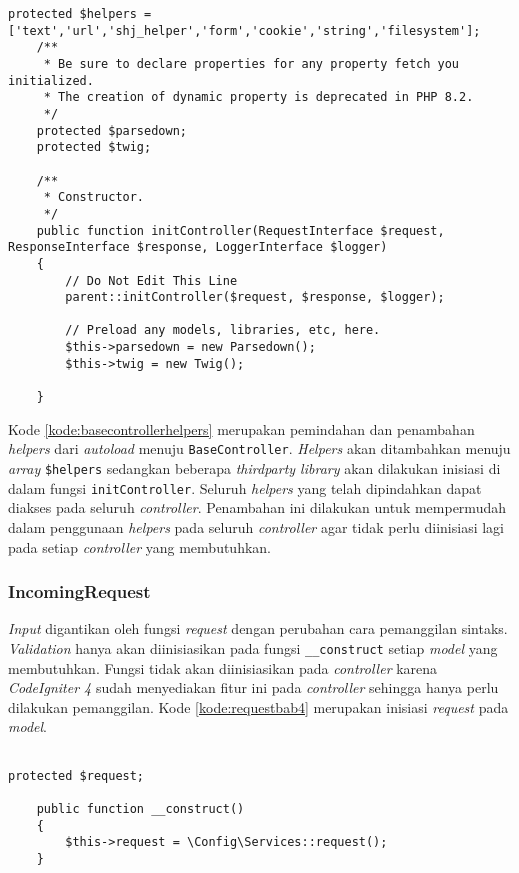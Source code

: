 \begin{lstlisting}[caption=Penambahan sintaks pada \texttt{BaseController}, label=kode:basecontrollerhelpers]
	protected $helpers = ['text','url','shj_helper','form','cookie','string','filesystem'];
	/**
     * Be sure to declare properties for any property fetch you initialized.
     * The creation of dynamic property is deprecated in PHP 8.2.
     */
    protected $parsedown;
    protected $twig;

    /**
     * Constructor.
     */
    public function initController(RequestInterface $request, ResponseInterface $response, LoggerInterface $logger)
    {
        // Do Not Edit This Line
        parent::initController($request, $response, $logger);

        // Preload any models, libraries, etc, here.
        $this->parsedown = new Parsedown();
        $this->twig = new Twig();
        
    }
\end{lstlisting}

Kode \ref{kode:basecontrollerhelpers} merupakan pemindahan dan penambahan \textit{helpers} dari \textit{autoload} menuju \texttt{BaseController}. \textit{Helpers} akan ditambahkan menuju \textit{array} \texttt{\$helpers} sedangkan beberapa \textit{thirdparty library} akan dilakukan inisiasi di dalam fungsi \texttt{initController}. Seluruh \textit{helpers} yang telah dipindahkan dapat diakses pada seluruh \textit{controller}. Penambahan ini dilakukan untuk mempermudah dalam penggunaan \textit{helpers} pada seluruh \textit{controller} agar tidak perlu diinisiasi lagi pada setiap \textit{controller} yang membutuhkan.

\subsubsection{IncomingRequest}
\textit{Input} digantikan oleh fungsi \textit{request} dengan perubahan cara pemanggilan sintaks. \textit{Validation} hanya akan diinisiasikan pada fungsi \texttt{\_\_construct} setiap \textit{model} yang membutuhkan. Fungsi tidak akan diinisiasikan pada \textit{controller} karena \textit{CodeIgniter 4} sudah menyediakan fitur ini pada \textit{controller} sehingga hanya perlu dilakukan pemanggilan. Kode \ref{kode:requestbab4} merupakan inisiasi \textit{request} pada \textit{model}.

\begin{lstlisting}[caption=Perancangan inisiasi \textit{request} pada \texttt{\_\_construct}, label=kode:requestbab4]

protected $request;

	public function __construct()
	{
		$this->request = \Config\Services::request(); 
	}
\end{lstlisting}


